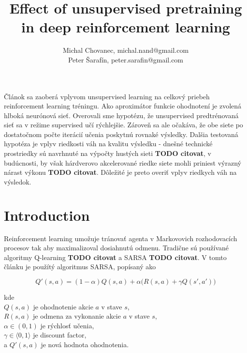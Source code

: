 \documentclass[10pt,a4paper]{article}
\begin{document}
\title{Effect of unsupervised pretraining in deep reinforcement learning}
\author{Michal Chovanec, michal.nand@gmail.com \\
Peter Šarafín, peter.sarafin@gmail.com}
\date{}
\maketitle
\thispagestyle{empty}




Článok sa zaoberá vplyvom unsupervised learning na celkový priebeh reinforcement learning tréningu.
Ako aproximátor funkcie ohodnotení je zvolená hlboká neurónová sieť.
Overovali sme hypotézu, že unsupervised predtrénovaná sieť sa v režime supervised učí
rýchlejšie. Zároveň sa ale očakáva, že obe siete po dostatočnom počte iterácií učenia
poskytnú rovnaké výsledky.
Dalšia testovaná hypotéza je vplyv riedkosti váh na kvalitu výsledku - dnešné
technické prostriedky sú navrhnuté na výpočty hustých sieti {\bf TODO citovat}, v budúcnosti, by
však hárdverovo akcelerované riedke siete mohli priniest výrazný nárast výkonu {\bf TODO citovat}.
Dôležité je preto overiť vplyv riedkych váh na výsledok.

\section{Introduction}

Reinforcement learning umožuje tránovať agenta v Markovovich rozhodovacích procesov tak
aby maximalizoval dosiahnutú odmenu.
Tradične sú používané algoritmy Q-learning {\bf TODO citovat} a SARSA {\bf TODO citovat}.
V tomto článku je použítý algoritmus SARSA, popísaný ako

\begin{equation}
  \label{eq:rl_sarsa_learning}
  Q'(s, a) = (1-\alpha)Q(s, a) + \alpha \Big(R(s, a) + \gamma Q(s', a') \Big)
\end{equation}

kde \\
$Q(s, a)$ je ohodnotenie akcie $a$ v stave $s$, \\
$R(s, a)$ je odmena za vykonanie akcie $a$ v stave $s$, \\
$\alpha \in (0, 1)$ je rýchlosť učenia, \\
$\gamma \in \langle 0, 1 \rangle$ je discount factor, \\
a $Q'(s, a)$ je nová hodnota ohodnotenia. \\
\end{document}
